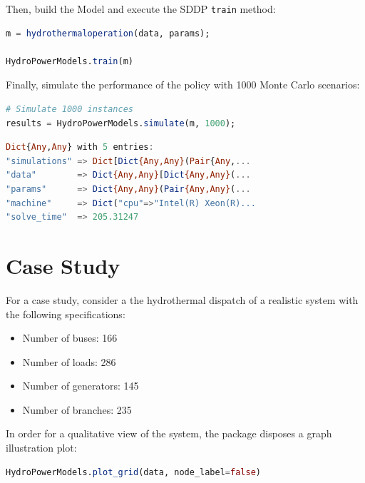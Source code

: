 \documentclass{juliacon}
\begin{document}
Then, build the Model and execute the SDDP \texttt{train} method:

\begin{lstlisting}[language = Julia]
m = hydrothermaloperation(data, params);

HydroPowerModels.train(m)
\end{lstlisting}

Finally, simulate the performance of the policy with 1000 Monte Carlo scenarios:

\begin{lstlisting}[language = Julia]
# Simulate 1000 instances
results = HydroPowerModels.simulate(m, 1000);
\end{lstlisting}
\begin{lstlisting}[language = Julia]
 Dict{Any,Any} with 5 entries:
"simulations" => Dict[Dict{Any,Any}(Pair{Any,...
"data"        => Dict{Any,Any}[Dict{Any,Any}(...
"params"      => Dict{Any,Any}(Pair{Any,Any}(...
"machine"     => Dict("cpu"=>"Intel(R) Xeon(R)...
"solve_time"  => 205.31247
\end{lstlisting}

\section{Case Study}
\label{sec:case}

For a case study, consider a the hydrothermal dispatch of a realistic system with the following specifications:

\begin{itemize}
    \item Number of buses: 166
    \item Number of loads: 286
    \item Number of generators: 145
    \item Number of branches: 235
\end{itemize}

In order for a qualitative view of the system, the package disposes a graph illustration plot:

\begin{lstlisting}[language = Julia]
HydroPowerModels.plot_grid(data, node_label=false)
\end{lstlisting}
\end{document}
